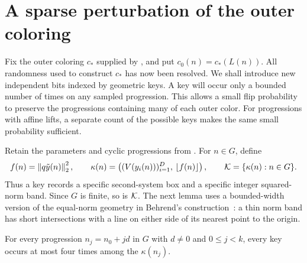 \section{A sparse perturbation of the outer coloring}
\label{perturb:section}

Fix the outer coloring $c_*$ supplied by , and put
$c_0(n)=c_*(L(n))$.  All randomness used to construct $c_*$ has now been
resolved.  We shall introduce new independent bits indexed by geometric
keys.  A key will occur only a bounded number of times on any sampled
progression.  This allows a small flip probability to preserve the
progressions containing many of each outer color.  For progressions with
affine lifts, a separate count of the possible keys makes the same small
probability sufficient.

Retain the parameters and cyclic progressions from
.  For $n\in G$, define
\begin{equation}\label{perturb:keys}
 f(n)=\left\lVert q\tilde y(n)\right\rVert_2^2,
 \qquad
 \kappa(n)=\left((V(y_i(n)))_{i=1}^D,\,\left\lfloor f(n)\right\rfloor\right),
 \qquad
 \mathcal K=\{\kappa(n):n\in G\}.
\end{equation}
Thus a key records a specific second-system box and a specific integer
squared-norm band.  Since $G$ is finite, so is $\mathcal K$.
The next lemma uses a bounded-width version of the equal-norm geometry
in Behrend's construction~\cite{behrend1946}: a thin norm band has
short intersections with a line on either side of its nearest point
to the origin.

\begin{lemma}\label{perturb:multiplicity}
For every progression $n_j=n_0+jd$ in $G$ with $d\ne0$ and
$0\le j<k$, every key occurs at most four times among the $\kappa(n_j)$.
\end{lemma}

